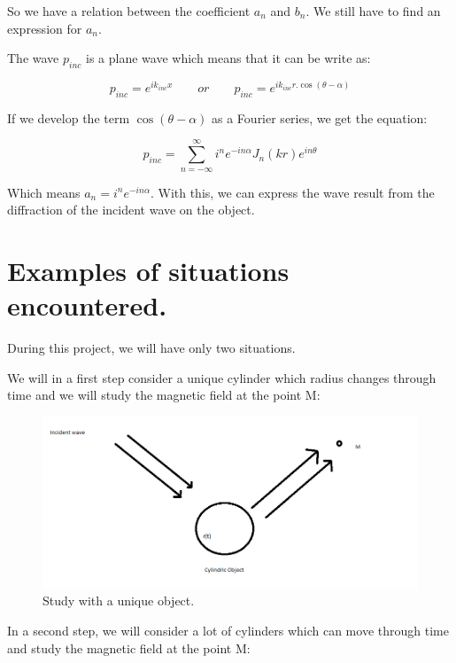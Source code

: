 So we have a relation between the coefficient $a_n$ and $b_n$. We still have to find an expression for $a_n$.

The wave $p_{inc}$ is a plane wave which means that it can be write as:

\begin{equation}
p_{inc} = e^{i k_{inc} x} \qquad or \qquad p_{inc} = e^{i k_{inc} r.\cos( \theta - \alpha )}
\end{equation}

If we develop the term $\cos(\theta-\alpha)$ as a Fourier series, we get the equation:

\begin{equation}
p_{inc} =  	\sum_{n=-\infty}^{\infty} i^n e^{-i n \alpha} J_{n}(kr)e^{in\theta} 
\end{equation}

Which means $a_n = i^n e^{-i n \alpha} $. With this, we can express the wave result from the diffraction of the incident wave on the object.

\chapter{Examples of situations encountered.}

During this project, we will have only two situations.

We will in a first step consider a unique  cylinder which radius changes through time and we will study the magnetic field at the point M:

\begin{figure}[H]
\centering
    \includegraphics[scale=0.6,angle=0]{Images/Image3.png}
    \caption{Study with a unique object.}
    \label{fig:Image3}
\end{figure}

In a second step, we will consider a lot of cylinders which can move through time and study the magnetic field at the point M: 

